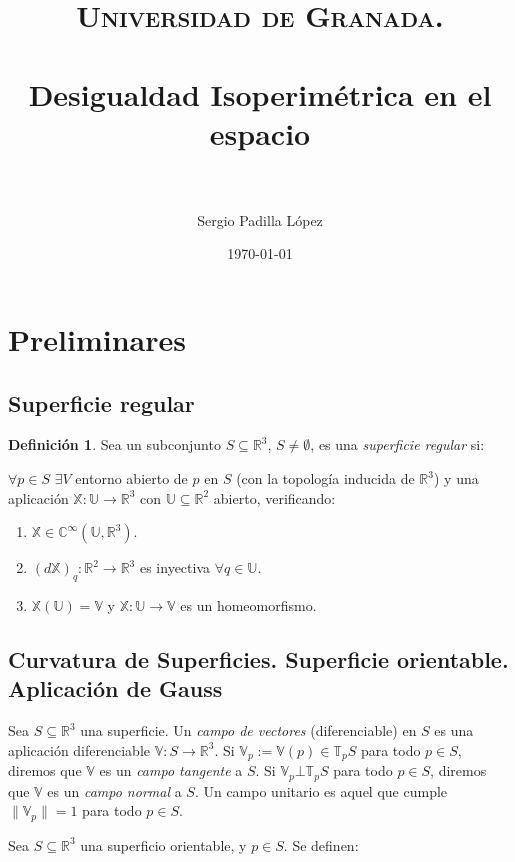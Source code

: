 \documentclass[paper=a4, fontsize=11pt, spanish]{scrartcl}
\title{
  \normalfont \normalsize
  \textsc{Universidad de Granada.} \\ [25pt]
  \horrule{0.5pt} \\[0.4cm]
  \huge Desigualdad Isoperimétrica en el espacio \\
  \horrule{2pt} \\[0.5cm]
}
\author{Sergio Padilla López}
\date{\normalsize\today}
\newcommand{\rdos}{\mathbb{R}^2}
\newcommand{\rtres}{\mathbb{R}^3}
\newcommand{\rdostortres}{\rdos \longrightarrow \rtres}
\newcommand{\umath}{\mathds{U}}
\newcommand{\vmath}{\mathds{V}}
\newcommand{\tmath}{\mathds{T}}
\newcommand{\utortres}{\umath \longrightarrow \rtres}
\newcommand{\utov}{\umath \longrightarrow \vmath}
\newcommand{\xmath}{\mathds{X}}
\newcommand{\cinf}{\mathds{C}^\infty}
\newcommand{\dxq}{(d\mathds{X})_{q}}
\theoremstyle{definition}
\theoremstyle{definition}
\newtheorem{definition}{Definición}
\theoremstyle{definition}
\begin{document}
\maketitle
\newpage

\tableofcontents

\newpage

\section{Preliminares}

\subsection{Superficie regular}

\begin{definition}
Sea un subconjunto $S \subseteq \rtres$, $S \neq \emptyset$, es una \textit{superficie regular} si:

$\forall p \in S$ $\exists V$ entorno abierto de $p$ en $S$ (con la topología inducida de $\rtres$) y una aplicación $\xmath: \utortres$ con $\umath \subseteq \rdos$ abierto, verificando:

\begin{enumerate}
    \item $\xmath \in \cinf(\umath, \rtres)$.
    \item $\dxq: \rdostortres$ es inyectiva $\forall q \in \umath$.
    \item $\xmath(\umath) = \vmath$ y $\xmath:\utov$ es un homeomorfismo.
\end{enumerate}
\end{definition}

\subsection{Curvatura de Superficies. Superficie orientable. Aplicación de Gauss}

Sea $S \subseteq \rtres$ una superficie. Un \textit{campo de vectores} (diferenciable) en $S$ es una aplicación diferenciable $\vmath: S \longrightarrow \rtres$. Si $\vmath_p := \vmath(p) \in \tmath_p S$ para todo $p \in S$, diremos que $\vmath$ es un \textit{campo tangente} a $S$. Si $\vmath_p \bot \tmath_p S$ para todo $p \in S$, diremos que $\vmath$ es un \textit{campo normal} a $S$. Un campo unitario es aquel que cumple $\parallel \vmath_p \parallel = 1$ para todo $p \in S$.

Sea $S \subseteq \rtres$ una superficio orientable, y $p \in S$. Se definen:
\end{document}
